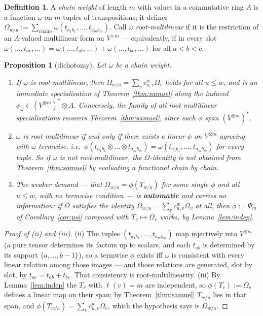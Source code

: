 \documentclass[11pt]{article}
\theoremstyle{plain}
\newtheorem{proposition}[theorem]{Proposition}
\theoremstyle{definition}
\newtheorem{definition}[theorem]{Definition}
\DeclareMathOperator{\len}{\ell}
\begin{document}
\begin{definition}
A \emph{chain weight} of length $m$ with values in a commutative ring $A$ is a
function $\omega$ on $m$-tuples of transpositions; it defines
$\Omega_{w/u}:=\sum_{\text{chains}}\omega(t_{a_{1}b_{1}},\dots,t_{a_{m}b_{m}})$.
Call $\omega$ \emph{root-multilinear} if it is the restriction of an
$A$-valued multilinear form on $V^{\times m}$ --- equivalently, if in every
slot
$\omega(\dots,t_{ac},\dots)=\omega(\dots,t_{ab},\dots)+\omega(\dots,t_{bc},\dots)$
for all $a<b<c$.
\end{definition}

\begin{proposition}[dichotomy]\label{prop:dichotomy}
Let $\omega$ be a chain weight.
\begin{enumerate}
\item[(i)] If $\omega$ is root-multilinear, then
$\Omega_{w/u}=\sum_{v}c^{w}_{u,v}\Omega_{v}$ holds for all $u\le w$, and is an
immediate specialisation of Theorem~\ref{thm:samuel} along the induced
$\phi_{\omega}\in(V^{\otimes m})^{*}\otimes A$. Conversely, the family of all
root-multilinear specialisations recovers Theorem~\ref{thm:samuel}, since such
$\phi$ span $(V^{\otimes m})^{*}$.
\item[(ii)] $\omega$ is root-multilinear if and only if there exists a linear
$\phi$ on $V^{\otimes m}$ agreeing with $\omega$ \emph{termwise}, i.e.\
$\phi(t_{a_{1}b_{1}}\otimes\dots\otimes t_{a_{m}b_{m}})
=\omega(t_{a_{1}b_{1}},\dots,t_{a_{m}b_{m}})$ for every tuple. So if $\omega$ is
not root-multilinear, the $\Omega$-identity is not obtained from
Theorem~\ref{thm:samuel} by evaluating a functional chain by chain.
\item[(iii)] The weaker demand --- that $\Omega_{w/u}=\phi(T_{w/u})$ for
\emph{some} single $\phi$ and all $u\le w$, with no termwise condition --- is
\textbf{automatic} and carries no information: if $\Omega$ satisfies the
identity $\Omega_{w/u}=\sum_{v}c^{w}_{u,v}\Omega_{v}$ at all, then
$\phi:=\Psi_{m}$ of Corollary~\ref{cor:psi} composed with $T_{v}\mapsto\Omega_{v}$
works, by Lemma~\ref{lem:indep}.
\end{enumerate}
\end{proposition}

\begin{proof}[Proof of (ii) and (iii)]
(ii) The tuples $(t_{a_{1}b_{1}},\dots,t_{a_{m}b_{m}})$ map injectively into
$V^{\otimes m}$ (a pure tensor determines its factors up to scalars, and each
$t_{ab}$ is determined by its support $\{a,\dots,b-1\}$), so a termwise
$\phi$ exists iff $\omega$ is consistent with every linear relation among those
images --- and those relations are generated, slot by slot, by
$t_{ac}=t_{ab}+t_{bc}$. That consistency is root-multilinearity.
(iii) By Lemma~\ref{lem:indep} the $T_{v}$ with $\len(v)=m$ are independent, so
$\phi(T_{v}):=\Omega_{v}$ defines a linear map on their span; by
Theorem~\ref{thm:samuel} $T_{w/u}$ lies in that span, and
$\phi(T_{w/u})=\sum_{v}c^{w}_{u,v}\Omega_{v}$, which the hypothesis says is
$\Omega_{w/u}$.
\end{proof}
\end{document}
